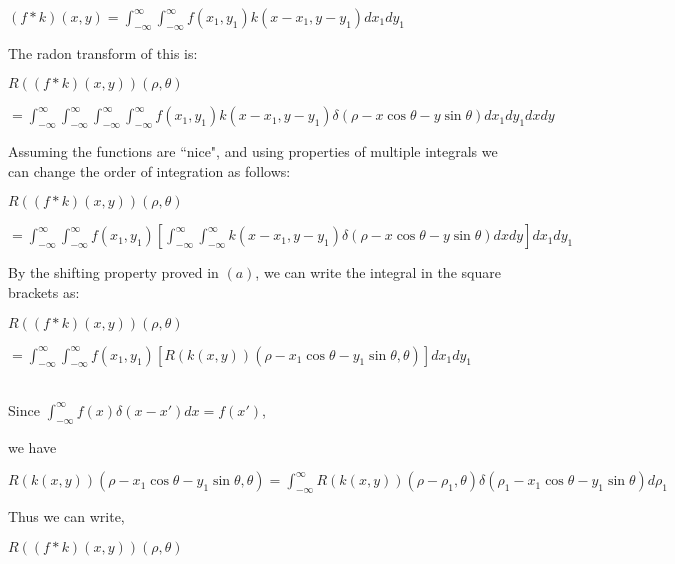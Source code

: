 \documentclass[fleqn, 11pt]{article}
\begin{document}
$(f * k) (x,y) = \displaystyle \int_{-\infty }^{\infty} \int_{-\infty }^{\infty}  f(x_1,y_1) k(x-x_1, y-y_1) dx_1 dy_1$

\bigskip

The radon transform of this is: 

\medskip 

$R((f * k) (x,y)) (\rho, \theta) 
$

\smallskip

$
=   \displaystyle \int_{-\infty }^{\infty} \int_{-\infty }^{\infty} \int_{-\infty }^{\infty} \int_{-\infty }^{\infty}  f(x_1,y_1) k(x-x_1, y-y_1) \delta (\rho - x \cos \theta - y \sin \theta)  
dx_1 dy_1 dx dy  $

\bigskip 

Assuming the functions are ``nice", and using properties of multiple integrals we can change 
the order of integration as follows:

\medskip 

$R((f * k) (x,y)) (\rho, \theta) 
$


\smallskip

$
=   \displaystyle \int_{-\infty }^{\infty} \int_{-\infty }^{\infty} f(x_1,y_1) \left[ \int_{-\infty }^{\infty} \int_{-\infty }^{\infty}   k(x-x_1, y-y_1) \delta (\rho - x \cos \theta - y \sin \theta)  dx dy \right]
dx_1 dy_1   $

\bigskip

By the shifting property proved in $(a)$, we can write the integral in the square brackets  as:

\medskip 

$R((f * k) (x,y)) (\rho, \theta) 
$


\smallskip

$
=   \displaystyle \int_{-\infty }^{\infty} \int_{-\infty }^{\infty} f(x_1,y_1) \left[ R(k(x,y))(\rho - x_1 \cos \theta - y_1 \sin \theta, \theta) \right]
dx_1 dy_1   $


~\\

Since $ \displaystyle \int_{-\infty }^{\infty} f(x) \delta(x-x') dx= f(x')$, 

we have 


$
R(k(x,y))(\rho - x_1 \cos \theta - y_1 \sin \theta, \theta)
=  \displaystyle \int_{-\infty }^{\infty} R(k(x,y))(\rho - \rho_1, \theta) \delta ( \rho_1 - x_1 \cos \theta - y_1 \sin \theta  ) d \rho_1
$

Thus we can write, 


\medskip 

$R((f * k) (x,y)) (\rho, \theta) 
$
\end{document}
